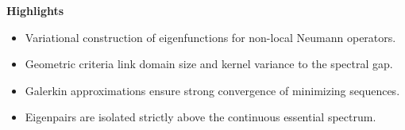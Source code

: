 \documentclass[11pt, a4paper]{article}
\begin{document}
\pagestyle{empty}

\noindent \centering \textbf{Highlights}
\vspace{1em}

\begin{itemize}
    \item Variational construction of eigenfunctions for non-local Neumann operators.
    \item Geometric criteria link domain size and kernel variance to the spectral gap.
    \item Galerkin approximations ensure strong convergence of minimizing sequences.
    \item Eigenpairs are isolated strictly above the continuous essential spectrum.
\end{itemize}
\end{document}
